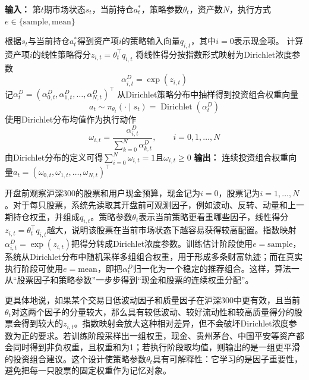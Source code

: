 \documentclass{sufethesismas}
\begin{document}
\begin{algorithm}[H]
\caption{Dirichlet策略函数抽取投资组合}
\label{alg:dirichlet_policy}
\begin{algorithmic}[1]
\STATE \textbf{输入：} 第$t$期市场状态$s_t$，当前持仓$a_{t}^*$，策略参数$\theta_t$，资产数$N$，执行方式$e\in\{\mathrm{sample},\mathrm{mean}\}$

    \STATE 根据$s_t$与当前持仓$a_t^*$得到资产项$i$的策略输入向量$q_{i,t}$，其中$i=0$表示现金项。
    \STATE 计算资产项$i$的线性策略得分$z_{i,t}=\theta_t^\top q_{i,t}$
    \STATE 将线性得分按指数形式映射为Dirichlet浓度参数
    \begin{equation*}
    \alpha^D_{i,t}
    =
    \exp(z_{i,t})
    \end{equation*}
\ENDFOR
\STATE 记$\alpha^D_t=(\alpha^D_{0,t},\alpha^D_{1,t},\dots,\alpha^D_{N,t})^\top$
    \STATE 从Dirichlet策略分布中抽样得到投资组合权重向量
\begin{equation*}
a_t
\sim
\pi_{\theta_t}(\cdot\mid s_t)
=
\operatorname{Dirichlet}(\alpha^D_t)
\end{equation*}
\ELSE
    \STATE 使用Dirichlet分布均值作为执行动作
\begin{equation*}
\omega_{i,t}
=
\frac{\alpha^D_{i,t}}{\sum_{k=0}^{N}\alpha^D_{k,t}},
\qquad
i=0,1,\dots,N
\end{equation*}
\ENDIF
\STATE 由Dirichlet分布的定义可得$\sum_{i=0}^{N}\omega_{i,t}=1$且$\omega_{i,t}\ge 0$
\STATE \textbf{输出：} 连续投资组合权重向量$a_t=(\omega_{0,t},\omega_{1,t},\dots,\omega_{N,t})^\top$
\end{algorithmic}
\end{algorithm}

开盘前观察沪深300的股票和用户现金预算，现金记为$i=0$，股票记为$i=1,\dots,N$。对于每只股票，系统先读取其开盘前可观测因子，例如波动、反转、动量和上一期持仓权重，并组成$q_{i,t}$。策略参数$\theta_t$表示当前策略更看重哪些因子，线性得分$z_{i,t}=\theta_t^\top q_{i,t}$越大，说明该股票在当前市场状态下越容易获得较高配置。指数映射$\alpha^D_{i,t}=\exp(z_{i,t})$把得分转成Dirichlet浓度参数。训练估计阶段使用$e=\mathrm{sample}$，系统从Dirichlet分布中随机采样多组组合权重，用于形成多条财富轨迹；而在真实执行阶段可使用$e=\mathrm{mean}$，即把$\alpha^D_t$归一化为一个稳定的推荐组合。这样，算法一从“股票因子和策略参数”一步步得到“现金和股票的连续权重分配”。

更具体地说，如果某个交易日低波动因子和质量因子在沪深300中更有效，且当前$\theta_t$对这两个因子的分量较大，那么具有较低波动、较好流动性和较高质量得分的股票会得到较大的$z_{i,t}$。指数映射会放大这种相对差异，但不会破坏Dirichlet浓度参数为正的要求。若训练阶段采样出一组权重，现金、贵州茅台、中国平安等资产都会同时得到非负权重，且权重和为1；若执行阶段取均值，则输出的是一组更平滑的投资组合建议。这个设计使策略参数$\theta_t$具有可解释性：它学习的是因子重要性，避免把每一只股票的固定权重作为记忆对象。
\end{document}
